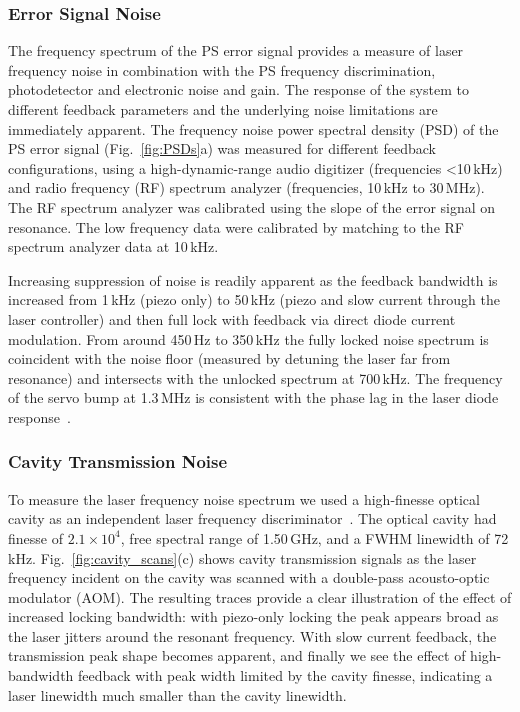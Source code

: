 \documentclass[10pt,letterpaper]{article}
\begin{document}
\subsubsection{Error Signal Noise}
The frequency spectrum of the PS error signal provides a measure of laser frequency noise in combination with the PS frequency discrimination, photodetector and electronic noise and gain.
The response of the system to different feedback parameters and the underlying noise limitations are immediately apparent.
The frequency noise power spectral density (PSD) of the PS error signal (Fig.~\ref{fig:PSDs}a) was measured for different feedback configurations, using a high-dynamic-range audio digitizer (frequencies \textless10\,kHz) and radio frequency (RF) spectrum analyzer (frequencies, 10\,kHz to 30\,MHz).
The RF spectrum analyzer was calibrated using the slope of the error signal on resonance.
The low frequency data were calibrated by matching to the RF spectrum analyzer data at 10\,kHz.

Increasing suppression of noise is readily apparent as the feedback bandwidth is increased from 1\,kHz (piezo only) to 50\,kHz (piezo and slow current through the laser controller) and then full lock with feedback via direct diode current modulation.
From around 450\,Hz to 350\,kHz the fully locked noise spectrum is coincident with the noise floor (measured by detuning the laser far from resonance) and intersects with the unlocked spectrum at 700\,kHz.
The frequency of the servo bump at 1.3\,MHz is consistent with the phase lag in the laser diode response~\cite{wiemanhollberg}.

\subsubsection{Cavity Transmission Noise}
To measure the laser frequency noise spectrum we used a high-finesse optical cavity as an independent laser frequency discriminator~\cite{equipment}.
The optical cavity had finesse of $2.1\times 10^4$, free spectral range of 1.50\,GHz, and a FWHM linewidth of 72\,kHz.
Fig.~\ref{fig:cavity_scans}(c) shows cavity transmission signals as the laser frequency incident on the cavity was scanned with a double-pass acousto-optic modulator (AOM).
The resulting traces provide a clear illustration of the effect of increased locking bandwidth: with piezo-only locking the peak appears broad as the laser jitters around the resonant frequency.
With slow current feedback, the transmission peak shape becomes apparent, and finally we see the effect of high-bandwidth feedback with peak width limited by the cavity finesse, indicating a laser linewidth much smaller than the cavity linewidth.
\end{document}
